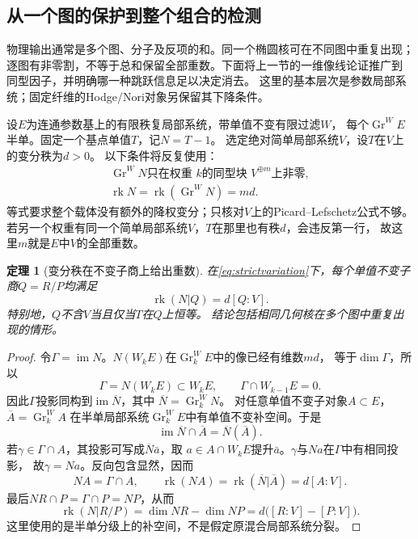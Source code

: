 \documentclass[11pt,a4paper]{ctexart}
\theoremstyle{cnplain}\newtheorem{theorem}{定理}[section]
\theoremstyle{definition}\newtheorem{definition}[theorem]{定义}
\theoremstyle{remark}\newtheorem{remark}[theorem]{注}
\newcommand{\rk}{\operatorname{rk}}\newcommand{\im}{\operatorname{im}}
\begin{document}
\subsection{从一个图的保护到整个组合的检测}
物理输出通常是多个图、分子及反项的和。同一个椭圆核可在不同图中重复出现；
逐图有非零割，不等于总和保留全部重数。下面将上一节的一维像线论证推广到
同型因子，并明确哪一种跳跃信息足以决定消去。
这里的基本层次是参数局部系统；固定纤维的Hodge/Nori对象另保留其下降条件。

设$E$为连通参数基上的有限秩复局部系统，带单值不变有限过滤$W$，
每个$\operatorname{Gr}^W E$半单。固定一个基点单值$T$，记$N=T-1$。
选定绝对简单局部系统$V$，设$T$在$V$上的变分秩为$d>0$。
以下条件将反复使用：
\begin{equation}\label{eq:strictvariation}
 \begin{gathered}
 \operatorname{Gr}^W N\text{只在权重 }k\text{的同型块 }V^{\oplus m}
       \text{上非零},\\
 \rk N=\rk(\operatorname{Gr}^W N)=md.
 \end{gathered}
\end{equation}
等式要求整个载体没有额外的降权变分；只核对$V$上的Picard--Lefschetz公式不够。
若另一个权重有同一个简单局部系统$V$，$T$在那里也有秩$d$，会违反第一行，
故这里$m$就是$E$中$V$的全部重数。

\begin{theorem}[变分秩在不变子商上给出重数]\label{thm:strictmultiplicity}
在\eqref{eq:strictvariation}下，每个单值不变子商$Q=R/P$均满足
\begin{equation}\label{eq:rankmultiplicity}
 \rk(N|Q)=d[Q:V].
\end{equation}
特别地，$Q$不含$V$当且仅当$T$在$Q$上恒等。
结论包括相同几何核在多个图中重复出现的情形。
\end{theorem}
\begin{proof}
令$\Gamma=\im N$。$N(W_kE)$在$\operatorname{Gr}_k^WE$中的像已经有维数$md$，
等于$\dim\Gamma$，所以
\[
 \Gamma=N(W_kE)\subset W_kE,\qquad
 \Gamma\cap W_{k-1}E=0.
\]
因此$\Gamma$投影同构到$\im\overline N$，其中
$\overline N=\operatorname{Gr}_k^WN$。
对任意单值不变子对象$A\subset E$，$\overline A=\operatorname{Gr}_k^WA$
在半单局部系统$\operatorname{Gr}_k^WE$中有单值不变补空间。于是
\[
 \im\overline N\cap\overline A=\overline N(\overline A).
\]
若$\gamma\in\Gamma\cap A$，其投影可写成$\overline N\bar a$，取
$a\in A\cap W_kE$提升$\bar a$。$\gamma$与$Na$在$\Gamma$中有相同投影，
故$\gamma=Na$。反向包含显然，因而
\[
 NA=\Gamma\cap A,\qquad
 \rk(NA)=\rk(\overline N|\overline A)=d[A:V].
\]
最后$NR\cap P=\Gamma\cap P=NP$，从而
\[
 \rk(N|R/P)=\dim NR-\dim NP
           =d\bigl([R:V]-[P:V]\bigr).
\]
这里使用的是半单分级上的补空间，不是假定原混合局部系统分裂。
\end{proof}
\end{document}
